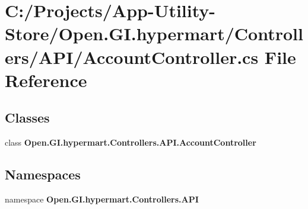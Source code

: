 \section{C\+:/\+Projects/\+App-\/\+Utility-\/\+Store/\+Open.G\+I.\+hypermart/\+Controllers/\+A\+P\+I/\+Account\+Controller.cs File Reference}
\label{_account_controller_8cs}
\subsection*{Classes}
\begin{DoxyCompactItemize}
\item 
class \textbf{ Open.\+G\+I.\+hypermart.\+Controllers.\+A\+P\+I.\+Account\+Controller}
\end{DoxyCompactItemize}
\subsection*{Namespaces}
\begin{DoxyCompactItemize}
\item 
namespace \textbf{ Open.\+G\+I.\+hypermart.\+Controllers.\+A\+PI}
\end{DoxyCompactItemize}
